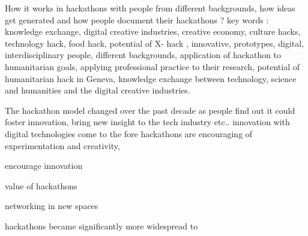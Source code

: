 How it works in hackathons with people from different backgrounds, how ideas get generated and how people document their hackathons ?
key words : knowledge exchange, digital creative industries, creative economy, culture hacks, technology hack, food hack, potential of X- hack , innovative, prototypes, digital, interdisciplinary people, different backgrounds, application of hackathon to humanitarian goals, applying professional practice to their research, potential of humanitarian hack in Geneva, knowledge exchange between technology, science and humanities and the digital creative industries.

The hackathon model changed over the past decade as people find out it could foster innovation, bring new insight to the tech industry etc..
innovation with digital technologies come to the fore 
hackathons are encouraging of experimentation and creativity,

encourage innovation 

value of hackathons

networking in new spaces

hackathons became significantly more widespread to